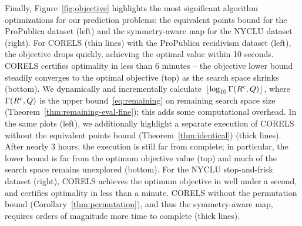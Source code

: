 Finally, Figure~\ref{fig:objective} highlights the most significant
algorithm optimizations for our prediction problems:
the equivalent points bound for the ProPublica dataset (left)
and the symmetry-aware map for the NYCLU dataset (right).
%
For CORELS (thin lines) with the ProPublica recidivism dataset (left),
the objective drops quickly, achieving the optimal value within 10 seconds.
CORELS certifies optimality in less than 6 minutes --
the objective lower bound steadily converges to the optimal objective (top)
as the search space shrinks (bottom).
%
We dynamically and incrementally
calculate~$\lfloor \log_{10} \Gamma({R^c}, Q) \rfloor$,
where~$\Gamma({R^c}, Q)$
is the upper bound~\eqref{eq:remaining} on remaining search space size
(Theorem~\ref{thm:remaining-eval-fine});
this adds some computational overhead.
%
In the same plots (left), we additionally highlight
a separate execution of CORELS without the equivalent points bound
(Theorem~\ref{thm:identical}) (thick lines).
%
After nearly 3 hours, the execution is still far from complete;
in particular, the lower bound is far from the optimum objective value (top)
and much of the search space remains unexplored (bottom).
%
For the NYCLU stop-and-frisk dataset (right),
CORELS achieves the optimum objective in well under a second,
and certifies optimality in less than a minute.
%
CORELS without the permutation bound (Corollary~\ref{thm:permutation}),
and thus the symmetry-aware map,
requires orders of magnitude more time to complete (thick lines).

